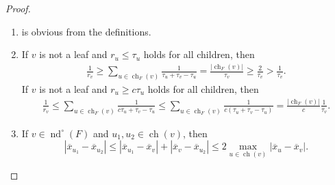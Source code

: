 \documentclass[reqno,draft]{amsart}
\numberwithin{equation}{section}
\theoremstyle{plain}
\theoremstyle{remark}
\DeclareMathOperator{\ch}{ch}
\DeclareMathOperator{\nd}{nd}
\newcommand{\interp}{\overline{x}} %
\begin{document}
\begin{proof}
    \begin{enumerate}
        \item is obvious from the definitions.
        \item If $v$ is not a leaf and $r_u \le \tau_u$ holds for all children, then
            \begin{align*}
                \frac{1}{r_v} \ge \sum_{u\in \ch_F(v)} \frac{1}{\tau_u + \tau_v - \tau_u} = \frac{|\ch_F(v)|}{\tau_v} \ge \frac{2}{\tau_v} > \frac{1}{\tau_v}.
            \end{align*}
            If $v$ is not a leaf and $r_u \ge c \tau_u$ holds for all children, then
            \begin{align*}
                \frac{1}{r_v} \le \sum_{u\in \ch_F(v)} \frac{1}{c \tau_u + \tau_v - \tau_u} \le \sum_{u\in \ch_F(v)} \frac{1}{c(\tau_u + \tau_v - \tau_u)} = \frac{|\ch_F(v)|}{c} \frac{1}{\tau_v}.
            \end{align*}
        \item If $v\in \nd^\circ (F)$ and $u_1,u_2\in \ch(v)$, then \[
                |\interp_{u_1}-\interp_{u_2}| \le |\interp_{u_1} - \interp_v| + |\interp_v - \interp_{u_2}| \le 2 \max_{u\in \ch(v)}|\interp_u-\interp_v|.
        \]
    \end{enumerate}
\end{proof}
\end{document}
